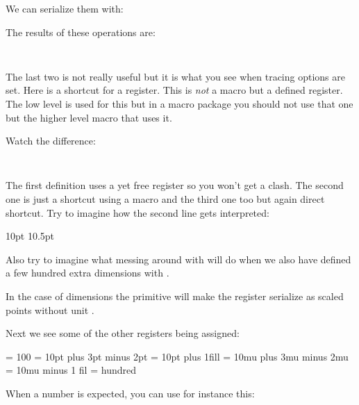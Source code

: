 \typebuffer[1][option=TEX]

We can serialize them with:

\startbuffer[2]
\the    {}
\number {}
\meaning{}
\meaning\scratchdimen
\stopbuffer

\typebuffer[2][option=TEX]

The results of these operations are:

\startlines\tt
\getbuffer[1,2]
\stoplines

The last two is not really useful but it is what you see when tracing options are
set. Here \type {\scratchdimen} is a shortcut for a register. This is {\em not} a
macro but a defined register. The low level \type {\dimendef} is used for this
but in a macro package you should not use that one but the higher level \type
{\newdimen} macro that uses it.

\startbuffer[1]
\newdimen\MyDimenA
\def     \MyDimenB{\dimen999}
\dimendef{}
\stopbuffer

\typebuffer[1][option=TEX]

\startbuffer[2]
\meaning\MyDimenA
\meaning\MyDimenB
\meaning\MyDimenC
\stopbuffer

\typebuffer[2][option=TEX]

Watch the difference:

\startlines\tt
\getbuffer[1,2]
\stoplines

The first definition uses a yet free register so you won't get a clash. The
second one is just a shortcut using a macro and the third one too but again
direct shortcut. Try to imagine how the second line gets interpreted:

\starttyping[option=TEX]
 
\MyDimenB10pt \MyDimenB10.5pt
 
\stoptyping

Also try to imagine what messing around with \type {\MyDimenC} will do when we
also have defined a few hundred extra dimensions with \type {\newdimen}.

In the case of dimensions the \type {\number} primitive will make the register
serialize as scaled points without unit .

Next we see some of the other registers being assigned:

\starttyping[option=TEX]
 = 100
 = 10pt plus 3pt minus 2pt
 = 10pt plus 1fill
 = 10mu plus 3mu minus 2mu
 = 10mu minus 1 fil
 = {hundred}
\stoptyping

When a number is expected, you can use for instance this:

